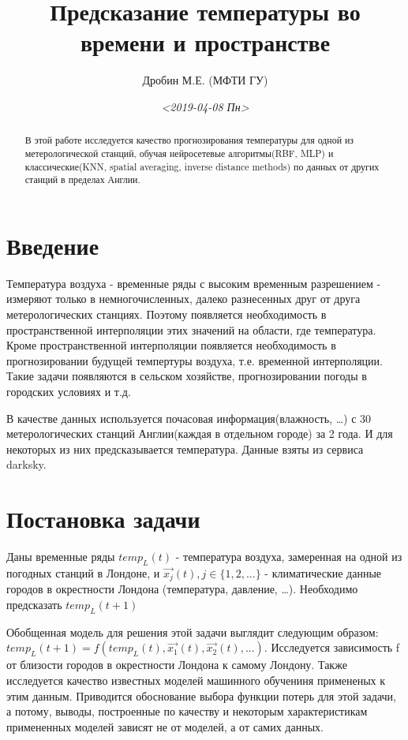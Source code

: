 \documentclass[11pt]{article}
\author{Дробин М.Е. (МФТИ ГУ)}
\date{\textit{<2019-04-08 Пн>}}
\title{Предсказание температуры во времени и пространстве}
\begin{document}
\maketitle
\tableofcontents

\begin{abstract}
В этой работе исследуется качество прогнозирования температуры для одной из метерологической станций, обучая нейросетевые алгоритмы(RBF, MLP) и
классические(KNN, spatial averaging, inverse distance methods) по данных от других станций в пределах Англии.
\end{abstract}

\section{Введение}
\label{sec:org0197b1e}
Температура воздуха - временные ряды с высоким временным разрешением - измеряют только в немногочисленных, далеко
разнесенных друг от друга метерологических станциях.  Поэтому появляется необходимость в пространственной интерполяции
этих значений на области, где температура. Кроме пространственной интерполяции появляется необходимость в
прогнозировании будущей темпертуры воздуха, т.е. временной интерполяции. Такие задачи появляются в сельском хозяйстве,
прогнозировании погоды в городских условиях и т.д.

В качестве данных используется почасовая информация(влажность, \ldots{}) с 30 метерологических станций Англии(каждая в
отдельном городе) за 2 года. И для некоторых из них предсказывается температура. Данные взяты из сервиса darksky.




\section{Постановка задачи}
\label{sec:org10ee69e}
Даны временные ряды \(temp_{L}(t)\) - температура воздуха, замеренная на
одной из погодных станций в Лондоне, и \(\vec{x_{j}}(t), j \in \{1, 2,
...\}\) - климатические данные городов в окрестности Лондона
(температура, давление, \ldots{}). Необходимо предсказать \(temp_{L}(t + 1)\)

Обобщенная модель для решения этой задачи выглядит следующим образом:
\(temp_{L}(t + 1) = f(temp_{L}(t), \vec{x_{1}}(t), \vec{x_{2}}(t),
...)\). Исследуется зависимость f от близости городов в окрестности
Лондона к самому Лондону. Также исследуется качество известных моделей
машинного обучениня примененых к этим данным. Приводится обоснование
выбора функции потерь для этой задачи, а потому, выводы, построенные
по качеству и некоторым характеристикам примененных моделей зависят не
от моделей, а от самих данных.
\end{document}
